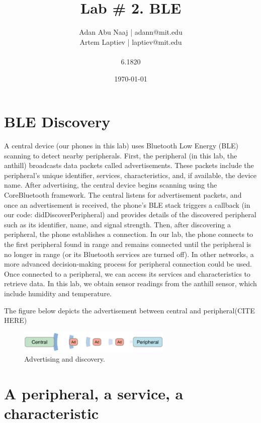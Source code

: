 \documentclass{lab}
\title{Lab \# 2. BLE} %
\author{Adan Abu Naaj | adann@mit.edu \\ Artem Laptiev | laptiev@mit.edu \\\\ 6.1820} %
\date{\today} %
\begin{document}
\maketitle

\newpage

\section{BLE Discovery}

A central device (our phones in this lab) uses Bluetooth Low Energy (BLE) scanning to detect nearby peripherals. First, the peripheral (in this lab, the anthill) broadcasts data packets called advertisements. These packets include the peripheral's unique identifier, services, characteristics, and, if available, the device name.
After advertising, the central device begins scanning using the CoreBluetooth framework. The central listens for advertisement packets, and once an advertisement is received, the phone’s BLE stack triggers a callback (in our code: didDiscoverPeripheral) and provides details of the discovered peripheral such as its identifier, name, and signal strength.
Then, after discovering a peripheral, the phone establishes a connection. In our lab, the phone connects to the first peripheral found in range and remains connected until the peripheral is no longer in range (or its Bluetooth services are turned off). In other networks, a more advanced decision-making process for peripheral connection could be used.
Once connected to a peripheral, we can access its services and characteristics to retrieve data. In this lab, we obtain sensor readings from the anthill sensor, which include humidity and temperature.

The figure below depicts the advertisement between central and peripheral(CITE HERE)

\begin{figure}[h]
    \begin{center}
    \includegraphics[width=0.65\textwidth]{images/AdvertisingAndDiscovery.png} 
    \caption{Advertising and discovery.}
    \end{center}
\end{figure}

\section{A peripheral, a service, a characteristic}
\end{document}

